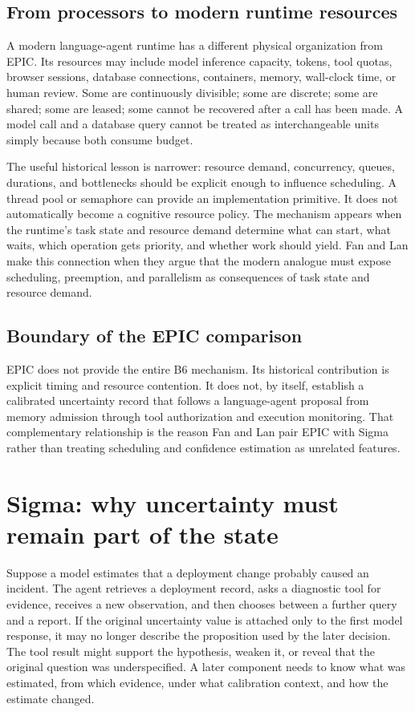 \subsection{From processors to modern runtime resources}
\label{sec:ch16-epic-modern}

A modern language-agent runtime has a different physical organization from EPIC. Its resources may include model inference capacity, tokens, tool quotas, browser sessions, database connections, containers, memory, wall-clock time, or human review. Some are continuously divisible; some are discrete; some are shared; some are leased; some cannot be recovered after a call has been made. A model call and a database query cannot be treated as interchangeable units simply because both consume budget.

The useful historical lesson is narrower: resource demand, concurrency, queues, durations, and bottlenecks should be explicit enough to influence scheduling. A thread pool or semaphore can provide an implementation primitive. It does not automatically become a cognitive resource policy. The mechanism appears when the runtime's task state and resource demand determine what can start, what waits, which operation gets priority, and whether work should yield. Fan and Lan make this connection when they argue that the modern analogue must expose scheduling, preemption, and parallelism as consequences of task state and resource demand.

\subsection{Boundary of the EPIC comparison}

EPIC does not provide the entire B6 mechanism. Its historical contribution is explicit timing and resource contention. It does not, by itself, establish a calibrated uncertainty record that follows a language-agent proposal from memory admission through tool authorization and execution monitoring. That complementary relationship is the reason Fan and Lan pair EPIC with Sigma rather than treating scheduling and confidence estimation as unrelated features.

\section{Sigma: why uncertainty must remain part of the state}
\label{sec:ch16-sigma}

Suppose a model estimates that a deployment change probably caused an incident. The agent retrieves a deployment record, asks a diagnostic tool for evidence, receives a new observation, and then chooses between a further query and a report. If the original uncertainty value is attached only to the first model response, it may no longer describe the proposition used by the later decision. The tool result might support the hypothesis, weaken it, or reveal that the original question was underspecified. A later component needs to know what was estimated, from which evidence, under what calibration context, and how the estimate changed.


